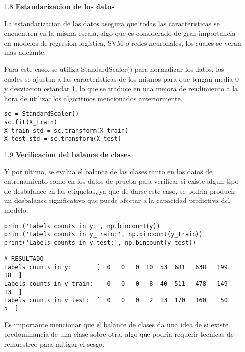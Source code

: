 \documentclass{article}
\begin{document}
\bigskip

\begin{itemize}

\item[1.8]  {\bf Estandarizacion de los datos}

La estandarizacion de los datos asegura que todas las caracteristicas se encuentren en la misma escala, algo que es considerado de gran importancia en modelos de regresion logistica, SVM o redes neuronales, los cuales se veran mas adelante.

Para este caso, se utiliza StandardScaler() para normalizar los datos, los cuales se ajustan a las caracteristicas de los mismos para que tengan media 0 y desviacion estandar 1, lo que se traduce en una mejora de rendimiento a la hora de utilizar los algoritmos mencionados anteriormente.

\begin{tcolorbox}[width=14cm]
\begin{scriptsize}
\begin{verbatim}
sc = StandardScaler()
sc.fit(X_train)
X_train_std = sc.transform(X_train)
X_test_std = sc.transform(X_test)
\end{verbatim}
\end{scriptsize}
\end{tcolorbox}

\end{itemize}

\bigskip

\begin{itemize}

\item[1.9]  {\bf Verificacion del balance de clases}

Y por ultimo, se evalua el balance de las clases tanto en los datos de entrenamiento como en los datos de prueba para verificar si existe algun tipo de desbalance en las etiquetas, ya que de darse este caso, se podria producir un desbalance significativo que puede afectar a la capacidad predictiva del modelo.

\begin{tcolorbox}[width=14cm]
\begin{scriptsize}
\begin{verbatim}
print('Labels counts in y:', np.bincount(y))
print('Labels counts in y_train:', np.bincount(y_train))
print('Labels counts in y_test:', np.bincount(y_test))

# RESULTADO
Labels counts in y:       [  0   0   0  10  53  681   638   199   18  ]
Labels counts in y_train: [  0   0   0   8  40  511   478   149   13  ]
Labels counts in y_test:  [  0   0   0   2  13  170   160    50    5  ]
\end{verbatim}
\end{scriptsize}
\end{tcolorbox}

Es importante mencionar que el balance de clases da una idea de si existe predominancia de una clase sobre otra, algo que podria requerir tecnicas de remuestreo para mitigar el sesgo.

\end{itemize}
\end{document}

